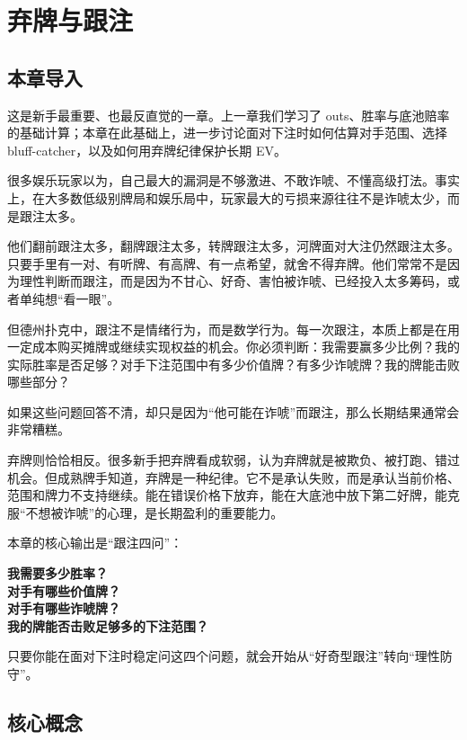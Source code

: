 \chapter{弃牌与跟注}

\section{本章导入}

这是新手最重要、也最反直觉的一章。上一章我们学习了 outs、胜率与底池赔率的基础计算；本章在此基础上，进一步讨论面对下注时如何估算对手范围、选择 bluff-catcher，以及如何用弃牌纪律保护长期 EV。

很多娱乐玩家以为，自己最大的漏洞是不够激进、不敢诈唬、不懂高级打法。事实上，在大多数低级别牌局和娱乐局中，玩家最大的亏损来源往往不是诈唬太少，而是跟注太多。

他们翻前跟注太多，翻牌跟注太多，转牌跟注太多，河牌面对大注仍然跟注太多。只要手里有一对、有听牌、有高牌、有一点希望，就舍不得弃牌。他们常常不是因为理性判断而跟注，而是因为不甘心、好奇、害怕被诈唬、已经投入太多筹码，或者单纯想“看一眼”。

但德州扑克中，跟注不是情绪行为，而是数学行为。每一次跟注，本质上都是在用一定成本购买摊牌或继续实现权益的机会。你必须判断：我需要赢多少比例？我的实际胜率是否足够？对手下注范围中有多少价值牌？有多少诈唬牌？我的牌能击败哪些部分？

如果这些问题回答不清，却只是因为“他可能在诈唬”而跟注，那么长期结果通常会非常糟糕。

弃牌则恰恰相反。很多新手把弃牌看成软弱，认为弃牌就是被欺负、被打跑、错过机会。但成熟牌手知道，弃牌是一种纪律。它不是承认失败，而是承认当前价格、范围和牌力不支持继续。能在错误价格下放弃，能在大底池中放下第二好牌，能克服“不想被诈唬”的心理，是长期盈利的重要能力。

本章的核心输出是“跟注四问”：

\begin{center}
\textbf{我需要多少胜率？\\
对手有哪些价值牌？\\
对手有哪些诈唬牌？\\
我的牌能否击败足够多的下注范围？}
\end{center}

只要你能在面对下注时稳定问这四个问题，就会开始从“好奇型跟注”转向“理性防守”。

\section{核心概念}

